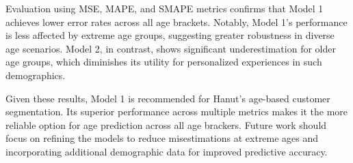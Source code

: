 \documentclass[10pt]{article}
\begin{document}
Evaluation using MSE, MAPE, and SMAPE metrics confirms that Model 1 achieves lower error rates across all age brackets. Notably, Model 1's performance is less affected by extreme age groups, suggesting greater robustness in diverse age scenarios. Model 2, in contrast, shows significant underestimation for older age groups, which diminishes its utility for personalized experiences in such demographics.

Given these results, Model 1 is recommended for Hanut's age-based customer segmentation. Its superior performance across multiple metrics makes it the more reliable option for age prediction across all age brackers. Future work should focus on refining the models to reduce misestimations at extreme ages and incorporating additional demographic data for improved predictive accuracy.
\end{document}
